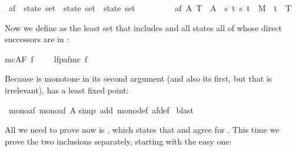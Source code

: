 \begin{isabellebody}
\isamarkuptrue%
\ af\ {\isacharcolon}{\isacharcolon}\ {\isachardoublequote}state\ set\ {\isasymRightarrow}\ state\ set\ {\isasymRightarrow}\ state\ set{\isachardoublequote}\isanewline
\ \ \ \ \ \ \ \ \ {\isachardoublequote}af\ A\ T\ {\isasymequiv}\ A\ {\isasymunion}\ {\isacharbraceleft}s{\isachardot}\ {\isasymforall}t{\isachardot}\ {\isacharparenleft}s{\isacharcomma}\ t{\isacharparenright}\ {\isasymin}\ M\ {\isasymlongrightarrow}\ t\ {\isasymin}\ T{\isacharbraceright}{\isachardoublequote}\isamarkupfalse%
%
\begin{isamarkuptext}%
\noindent
Now we define  as the least set  that includes
 and all states all of whose direct successors are in :%
\end{isamarkuptext}%
\isamarkuptrue%
\isamarkupfalse%
{\isachardoublequote}mc{\isacharparenleft}AF\ f{\isacharparenright}\ \ \ \ {\isacharequal}\ lfp{\isacharparenleft}af{\isacharparenleft}mc\ f{\isacharparenright}{\isacharparenright}{\isachardoublequote}\isamarkupfalse%
%
\begin{isamarkuptext}%
\noindent
Because  is monotone in its second argument (and also its first, but
that is irrelevant),  has a least fixed point:%
\end{isamarkuptext}%
\isamarkuptrue%
\ mono{\isacharunderscore}af{\isacharcolon}\ {\isachardoublequote}mono{\isacharparenleft}af\ A{\isacharparenright}{\isachardoublequote}\isanewline
\isamarkupfalse%
simp\ add{\isacharcolon}\ mono{\isacharunderscore}def\ af{\isacharunderscore}def{\isacharparenright}\isanewline
\isamarkupfalse%
\ blast\isanewline
\isamarkupfalse%
\isamarkupfalse%
\isamarkupfalse%
\isamarkupfalse%
\isamarkupfalse%
\isamarkupfalse%
\isamarkupfalse%
\isamarkupfalse%
\isamarkupfalse%
\isamarkupfalse%
\isamarkupfalse%
\isamarkupfalse%
\isamarkupfalse%
\isamarkupfalse%
\isamarkupfalse%
\isamarkupfalse%
\isamarkupfalse%
\isamarkupfalse%
\isamarkupfalse%
\isamarkupfalse%
%
\begin{isamarkuptext}%
All we need to prove now is  , which states
that  and \isa{{\isasymTurnstile}} agree for \@.
This time we prove the two inclusions separately, starting
with the easy one:%
\end{isamarkuptext}%

\end{isabellebody}
